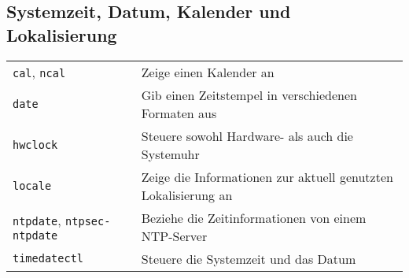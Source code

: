 \documentclass[10pt,a4paper]{article}
\begin{document}
\begin{multicols}{2}

\section{Systemzeit, Datum, Kalender und Lokalisierung}
\begin{tabular}{ p{2.5cm} p{8.5cm} }
  \hline
  \texttt{cal}, \texttt{ncal} & Zeige einen Kalender an\\
  \rowcolor{Gray}
  \texttt{date} & Gib einen Zeitstempel in verschiedenen Formaten aus \\
  \texttt{hwclock} & Steuere sowohl Hardware- als auch die Systemuhr\\
  \rowcolor{Gray}
  \texttt{locale} & Zeige die Informationen zur aktuell genutzten Lokalisierung an \\
  \texttt{ntpdate}, \texttt{ntpsec-ntpdate} & Beziehe die Zeitinformationen von einem NTP-Server \\
  \rowcolor{Gray}
  \texttt{timedatectl} & Steuere die Systemzeit und das Datum \\
  \hline
\end{tabular}



\end{multicols}
\end{document}

